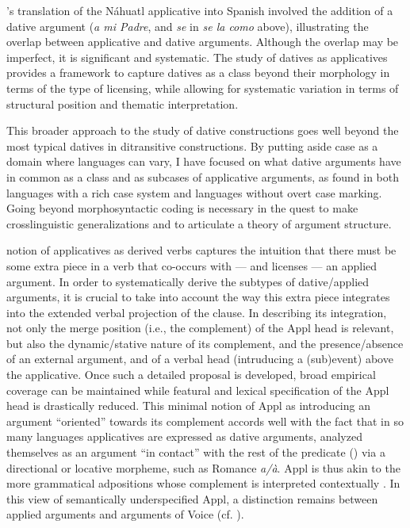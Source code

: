 \documentclass[output=paper,colorlinks,citecolor=brown,modfonts,nonflat]{langsci/langscibook}
\begin{document}
\citeauthor{Carochi1645}’s translation of the Náhuatl applicative into Spanish involved the addition of a dative argument (\textit{a mi Padre}, and \textit{se} in \textit{se la como} above),  illustrating the overlap between applicative and dative arguments. Although the overlap may be imperfect, it is significant and systematic. The study of datives as applicatives provides a framework to capture datives as a class beyond their morphology in terms of the type of licensing, while allowing for systematic variation in terms of structural position and thematic interpretation.

This broader approach to the study of dative constructions goes well beyond the most typical datives in ditransitive constructions. By putting aside case as a domain where languages can vary, I have focused on what dative arguments have in common as a class and as subcases of applicative arguments, as found in both languages with a rich case system and languages without overt case marking. Going beyond morphosyntactic coding is necessary in the quest to make crosslinguistic generalizations and to articulate a theory of argument structure.

 notion of applicatives as derived verbs captures the intuition that there must be some extra piece in a verb that co-occurs with — and licenses — an applied argument. In order to systematically derive the subtypes of dative/applied arguments, it is crucial to take into account the way this extra piece integrates into the extended verbal projection of the clause. In describing its integration, not only the merge position (i.e., the complement) of the Appl head is relevant, but also the dynamic/stative nature of its complement, and the presence/absence of an external argument, and of a verbal head (intruducing a (sub)event) above the applicative. Once such a detailed proposal is developed, broad empirical coverage can be maintained while featural and lexical specification of the Appl head is drastically reduced. This minimal notion of Appl as introducing an argument “oriented” towards its complement accords well with the fact that in so many languages applicatives are expressed as dative arguments, analyzed themselves as an argument “in contact” with the rest of the predicate () via a directional or locative morpheme, such as Romance \textit{a/à}. Appl is thus akin to the more grammatical adpositions whose complement is interpreted contextually \citep{Svenonius2007}. In this view of semantically underspecified Appl, a distinction remains between applied arguments and arguments of Voice (cf. \citealt{WoodMarantz2017}).
\end{document}
